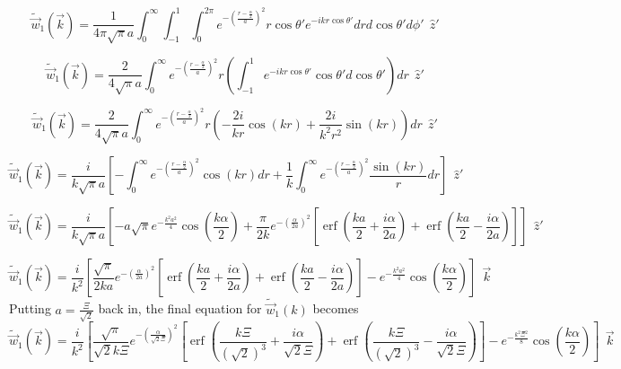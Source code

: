 \documentclass[double,12pt]{beavtex}
\begin{document}
\begin{equation}{\widetilde{\vec{w}}_1(\vec{k})=\frac{1}{4\pi\sqrt{\pi}a}\int_{0}^{\infty}\int_{-1}^{1}\int_{0}^{2\pi}e^{-\left(\frac{r-\frac{\alpha}{2}}{a}\right)^2}r\cos{\theta}'e^{-ikr\cos\theta'}d{r}d{\cos\theta'}d{\phi'}{~~}\hat{z}'}\end{equation}

\begin{equation}{\widetilde{\vec{w}}_1(\vec{k})=\frac{2}{4\sqrt{\pi}a}\int_{0}^{\infty}e^{-\left(\frac{r-\frac{\alpha}{2}}{a}\right)^2}r\left(\int_{-1}^{1}e^{-ikr\cos\theta'}\cos{\theta}'d{\cos\theta'}\right)d{r}{~~}\hat{z}'}\end{equation}

\begin{equation}{\widetilde{\vec{w}}_1(\vec{k})=\frac{2}{4\sqrt{\pi}a}\int_{0}^{\infty}e^{-\left(\frac{r-\frac{\alpha}{2}}{a}\right)^2}r\left(-\frac{2i}{kr}\cos(kr)+\frac{2i}{k^2r^2}\sin(kr)\right)d{r}{~~}\hat{z}'}\end{equation}

\begin{equation}{\widetilde{\vec{w}}_1(\vec{k})=\frac{i}{k\sqrt{\pi}a}\left[-\int_{0}^{\infty}e^{-\left(\frac{r-\frac{\alpha}{2}}{a}\right)^2}\cos(kr)d{r}+\frac{1}{k}\int_{0}^{\infty}e^{-\left(\frac{r-\frac{\alpha}{2}}{a}\right)^2}\frac{\sin(kr)}{r}d{r}\right]{~~}\hat{z}'}\end{equation}

\begin{equation}{\widetilde{\vec{w}}_1(\vec{k})=\frac{i}{k\sqrt{\pi}a}\left[-a\sqrt{\pi}e^{-\frac{k^2a^2}{4}}\cos\left(\frac{k\alpha}{2}\right)+\frac{\pi}{2k}e^{-\left(\frac{\alpha}{2a}\right)^2}\left[\operatorname{erf}\left(\frac{ka}{2}+\frac{i\alpha}{2a}\right)+\operatorname{erf}\left(\frac{ka}{2}-\frac{i\alpha}{2a}\right)\right]\right]{~~}\hat{z}'}\end{equation}

\begin{equation}{\widetilde{\vec{w}}_1(\vec{k})=\frac{i}{k^2}\left[\frac{\sqrt{\pi}}{2ka}e^{-\left(\frac{\alpha}{2a}\right)^2}\left[\operatorname{erf}\left(\frac{ka}{2}+\frac{i\alpha}{2a}\right)+\operatorname{erf}\left(\frac{ka}{2}-\frac{i\alpha}{2a}\right)\right]-e^{-\frac{k^2a^2}{4}}\cos\left(\frac{k\alpha}{2}\right)\right]{~~}\vec{k}}\end{equation}
Putting $a=\frac{\Xi}{\sqrt{2}}$ back in, the final equation for 
$\widetilde{\vec{w}}_1(k)$ becomes
\begin{equation}{\widetilde{\vec{w}}_1(\vec{k})=\frac{i}{k^2}\left[\frac{\sqrt{\pi}}{\sqrt{2}k\Xi}e^{-\left(\frac{\alpha}{\sqrt{2}\Xi}\right)^2}\left[\operatorname{erf}\left(\frac{k\Xi}{(\sqrt{2})^3}+\frac{i\alpha}{\sqrt{2}\Xi}\right)+\operatorname{erf}\left(\frac{k\Xi}{(\sqrt{2})^3}-\frac{i\alpha}{\sqrt{2}\Xi}\right)\right]-e^{-\frac{k^2\Xi^2}{8}}\cos\left(\frac{k\alpha}{2}\right)\right]{~~}\vec{k}}\end{equation}
\end{document}
